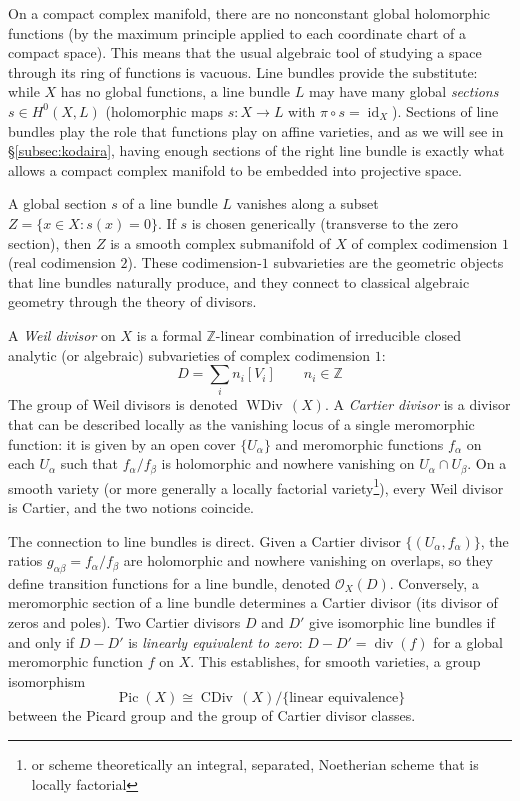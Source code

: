 \documentclass{article}
\newcommand{\Z}{{\mathbb{Z}}}
\newcommand{\CO}{\mathcal{O}}
\newcommand{\Pic}{\operatorname{Pic}}
\renewcommand{\div}{{\operatorname{div}}}
\newcommand{\id}{\operatorname{id}}
\newcommand{\CDiv}{{\operatorname{CDiv}\,}}
\newcommand{\WDiv}{{\operatorname{WDiv}\,}}
\begin{document}
On a compact complex manifold, there are no nonconstant global holomorphic
functions (by the maximum principle applied to each coordinate chart of a
compact space). This means that the usual algebraic tool of studying a space
through its ring of functions is vacuous. Line bundles provide the substitute:
while $X$ has no global functions, a line bundle $L$ may have many global
\emph{sections} $s \in H^0(X, L)$ (holomorphic maps $s: X \to L$ with
$\pi \circ s = \id_X$). Sections of line bundles play the role that functions
play on affine varieties, and as we will see in \S\ref{subsec:kodaira}, having
enough sections of the right line bundle is exactly what allows a compact
complex manifold to be embedded into projective space.

A global section $s$ of a line bundle $L$ vanishes along a subset
$Z = \{x \in X : s(x) = 0\}$. If $s$ is chosen generically (transverse to the
zero section), then $Z$ is a smooth complex submanifold of $X$ of complex
codimension $1$ (real codimension $2$). These codimension-$1$ subvarieties are
the geometric objects that line bundles naturally produce, and they connect to
classical algebraic geometry through the theory of divisors.

A \emph{Weil divisor} on $X$ is a formal $\Z$-linear combination of
irreducible closed analytic (or algebraic) subvarieties of complex
codimension $1$:
\[
  D = \sum_i n_i [V_i] \qquad n_i \in \Z
\]
The group of Weil divisors is denoted $\WDiv(X)$. A \emph{Cartier divisor} is a divisor that can be described
locally as the vanishing locus of a single meromorphic function: it is given by an open cover $\{U_\alpha\}$
and meromorphic functions $f_\alpha$ on each $U_\alpha$ such that $f_\alpha / f_\beta$ is holomorphic and
nowhere vanishing on $U_\alpha \cap U_\beta$. On a smooth variety (or more generally a locally factorial
variety\footnote{or scheme theoretically an integral, separated, Noetherian scheme that is locally factorial
}), every Weil divisor is Cartier, and the two notions coincide.

The connection to line bundles is direct. Given a Cartier divisor
$\{(U_\alpha, f_\alpha)\}$, the ratios $g_{\alpha\beta} = f_\alpha / f_\beta$
are holomorphic and nowhere vanishing on overlaps, so they define transition
functions for a line bundle, denoted $\CO_X(D)$. Conversely, a meromorphic
section of a line bundle determines a Cartier divisor (its divisor of zeros
and poles). Two Cartier divisors $D$ and $D'$ give isomorphic line bundles if
and only if $D - D'$ is \emph{linearly equivalent to zero}: $D - D' = \div(f)$
for a global meromorphic function $f$ on $X$. This establishes, for smooth
varieties, a group isomorphism
\[
  \Pic(X) \cong \CDiv(X) / \{\text{linear equivalence}\}
\]
between the Picard group and the group of Cartier divisor classes.
\end{document}
